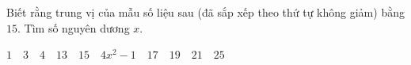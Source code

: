 \begin{ex}
Biết rằng trung vị của mẫu số liệu sau (đã sắp xếp theo thứ tự không giảm) bằng $15$. Tìm số nguyên dương $x$.
\begin{center}
$1$\ \ $3$\ \ $4$\ \ $13$\ \ $15$\ \ $4x^2-1$\ \ $17$\ \ $19$\ \ $21$\ \ $25$
\end{center}
\end{ex}

